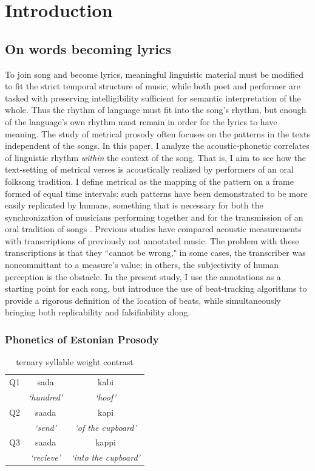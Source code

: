 \chapter{Introduction}

\section{On words becoming lyrics}
To join song and become lyrics, meaningful linguistic material must be modified to fit the strict temporal structure of music, while both poet and performer are tasked with preserving intelligibility sufficient for semantic interpretation of the whole. Thus the rhythm of language must fit into the song's rhythm, but enough of the language's own rhythm must remain in order for the lyrics to have meaning. The study of metrical prosody often focuses on the patterns in the texts independent of the songs. In this paper, I analyze the acoustic-phonetic correlates of linguistic rhythm {\it within} the context of the song. That is, I aim to see how the text-setting of metrical verses is acoustically realized by performers of an oral folksong tradition.  I define metrical as the mapping of the pattern on a frame formed of equal time intervals: such patterns have been demonstrated to be more easily replicated by humans, something that is necessary for both the synchronization of musicians performing together and for the transmission of an oral tradition of songs \citep{essensPovel1985}. Previous studies have compared acoustic measurements with transcriptions of previously not annotated music. The problem with these transcriptions is that they ``cannot be wrong," in some cases, the transcriber was noncommittant to a measure's value; in others, the subjectivity of human perception is the obstacle. In the present study, I use the annotations as a starting point for each song, but introduce the use of beat-tracking algorithms to provide a rigorous definition of the location of beats, while simultaneously bringing both replicability and falsifiability along. 

\subsection{Phonetics of Estonian Prosody} 
 \begin{table}[htb]
\centering
\begin{tabular}{lcc}
\hline

Q1 &		 sada 		& 	kabi  \\  
	&	 {\it `hundred'} 	&	 {\it`hoof' }\\
\hline
Q2 &		saada 		&	kapi \\
	&	 {\it`send' }		&	{\it`of the cupboard' }		\\
\hline
Q3 &		saada 	&	 kappi 	\\
	&	{\it`recieve' }	&	{\it`into the cupboard' }	\\
\hline
\end{tabular}

\caption{ternary syllable weight contrast}
\label{qexamps}
\end{table}

